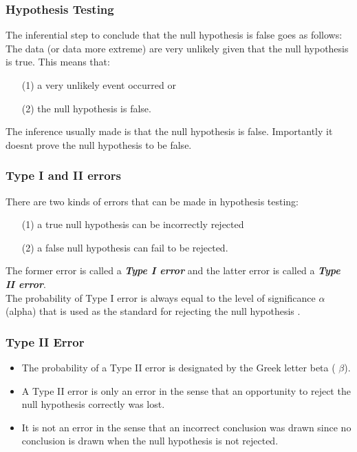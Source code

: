 \begin{frame}
\frametitle{Hypothesis Testing}
\large
The inferential step to conclude that the null hypothesis is false goes as follows: The data (or data more extreme) are very unlikely given that the null hypothesis is true.
\bigskip
This means that:
\begin{itemize}\item [(1)] a very unlikely event occurred or
\item[(2)] the null hypothesis is false. \end{itemize}
The inference usually made is that the null hypothesis is false. Importantly it doesnt prove the null hypothesis to be false.
\end{frame}
\begin{frame}
\frametitle{Type I and II errors}
\large
There are two kinds of errors that can be made in hypothesis testing:
\begin{itemize}
\item[(1)] a true null hypothesis can be incorrectly rejected
\item[(2)] a false null hypothesis can fail to be rejected.
\end{itemize}
The former error is called a \textbf{\emph{Type I error}} and the latter error is called a \textbf{\emph{Type II error}}. \\ \bigskip
The probability of Type I error is always equal to the level of significance $\alpha$ (alpha) that is used as the standard for rejecting the null hypothesis .
\end{frame}
\begin{frame}
\frametitle{Type II Error}
\begin{itemize}

\item The probability of a Type II error is designated by the Greek letter beta ( $\beta$).
\item A Type II error is only an error in the sense that an opportunity to reject the null hypothesis correctly was lost.
\item It is not an error in the sense that an incorrect conclusion was drawn since no conclusion is drawn when the null hypothesis is not rejected.
\end{itemize}
\end{frame}
